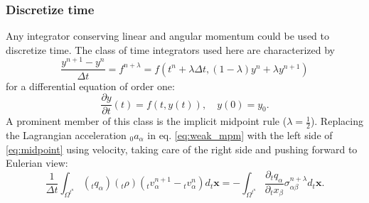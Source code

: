 \documentclass[m,times]{cgMA}
\begin{document}
\subsubsection{Discretize time}
Any integrator conserving linear and angular momentum could be used to discretize time. The class of time integrators used here are characterized by \begin{equation}\label{eq:midpoint}
  \frac{y ^ { n + 1 } - y ^ { n }}{ \Delta t} = f^{n+\lambda} = f \left(t^n+\lambda\Delta t, (1-\lambda) y ^ { n } +\lambda y^{n+1}\right)
\end{equation}
for a differential equation of order one:
\begin{equation}
  \frac{\partial y}{\partial t}( t ) = f (t,y(t)) , \quad y (0) = y _ { 0 }.
\end{equation}
A prominent member of this class is the implicit midpoint rule ($\lambda =\frac{1}{2}$). Replacing the Lagrangian acceleration $_0a_\alpha$ in eq. \ref{eq:weak_mpm} with the left side of \ref{eq:midpoint} using velocity, taking care of the right side and pushing forward to Eulerian view:
\begin{equation}\label{eq:time_disc}
  \frac{1}{\Delta t} \int _{ \Omega^{t^n}}(_tq_\alpha)(_t\rho)({_tv_\alpha^{n+1}}-{_tv_\alpha^{n}}) d_t\boldsymbol{x} =
  -  \int _ { \Omega ^ { t^n} } \frac{\partial _tq _ \alpha}{\partial _tx_\beta} \sigma _ {\alpha\beta}^{n+\lambda} d_t\boldsymbol{x}.
\end{equation}
\end{document}
